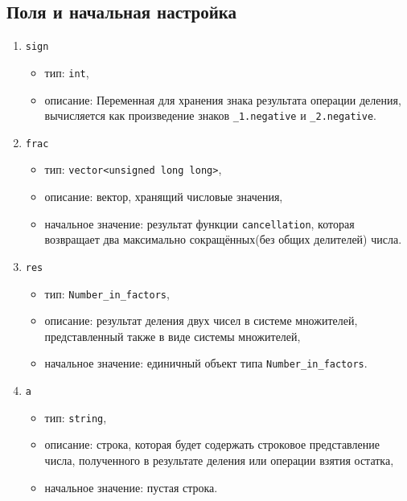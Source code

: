 \subsection*{Поля и начальная настройка}
\begin{enumerate}
	\item \texttt{sign}
	\begin{itemize}
		\item тип: \texttt{int},
		\item описание: Переменная для хранения знака результата операции деления, вычисляется как произведение знаков \texttt{\_1.negative} и \texttt{\_2.negative}.
	\end{itemize}
	
	\item \texttt{frac}
	\begin{itemize}
		\item тип: \texttt{vector<unsigned long long>},
		\item описание: вектор, хранящий числовые значения,
		\item начальное значение: результат функции \texttt{cancellation}, которая возвращает два максимально сокращённых(без общих делителей) числа.
	\end{itemize}
	
	\item \texttt{res}
	\begin{itemize}
		\item тип: \texttt{Number\_in\_factors},
		\item описание: результат деления двух чисел в системе множителей, представленный также в виде системы множителей,
		\item начальное значение: единичный объект типа \texttt{Number\_in\_factors}.
	\end{itemize}
	
	\item \texttt{a}
	\begin{itemize}
		\item тип: \texttt{string},
		\item описание: строка, которая будет содержать строковое представление числа, полученного в результате деления или операции взятия остатка,
		\item начальное значение: пустая строка.
	\end{itemize}
\end{enumerate}


